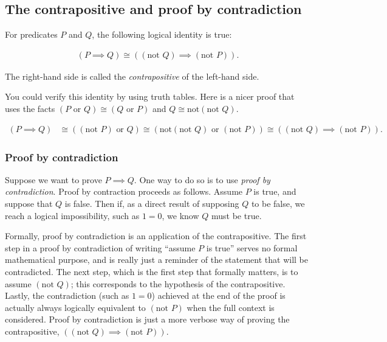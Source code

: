 \subsection*{The contrapositive and proof by contradiction}

For predicates $P$ and $Q$, the following logical identity is true:

\begin{align*}
    (P \implies Q) \cong ((\text{not } Q) \implies (\text{not } P)).
\end{align*}

The right-hand side is called the \textit{contrapositive} of the left-hand side.

You could verify this identity by using truth tables. Here is a nicer proof that uses the facts $(P \text{ or } Q) \cong (Q \text{ or } P)$ and $Q \cong \text{not}(\text{not } Q)$.

\begin{align*}
    (P \implies Q) &\cong ((\text{not } P) \text{ or } Q ) 
    \cong (\text{not}(\text{not } Q) \text{ or } (\text{not } P))
    \cong ((\text{not } Q) \implies (\text{not } P)).
\end{align*}

\subsubsection{Proof by contradiction}

Suppose we want to prove $P \implies Q$. One way to do so is to use \textit{proof by contradiction}. Proof by contraction proceeds as follows. Assume $P$ is true, and suppose that $Q$ is false. Then if, as a direct result of supposing $Q$ to be false, we reach a logical impossibility, such as $1 = 0$, we know $Q$ must be true.

Formally, proof by contradiction is an application of the contrapositive. The first step in a proof by contradiction of writing ``assume $P$ is true'' serves no formal mathematical purpose, and is really just a reminder of the statement that will be contradicted. The next step, which is the first step that formally matters, is to assume $(\text{not } Q)$; this corresponds to the hypothesis of the contrapositive. Lastly, the contradiction (such as $1 = 0$) achieved at the end of the proof is actually always logically equivalent to $(\text{not } P)$ when the full context is considered. Proof by contradiction is just a more verbose way of proving the contrapositive, $((\text{not } Q) \implies (\text{not } P))$.

